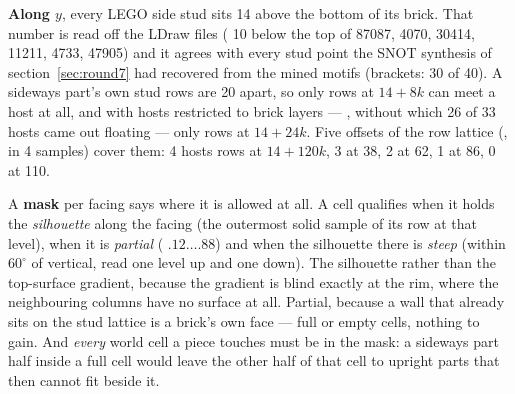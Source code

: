 \textbf{Along $y$}, every LEGO side stud sits 14\ldu{} above the bottom of its brick. That number is read off the LDraw files
( 10\ldu{} below the top of 87087, 4070, 30414, 11211, 4733, 47905) and it agrees with every stud point the SNOT
synthesis of section~\ref{sec:round7} had recovered from the mined motifs (brackets: 30 of 40). A sideways part's own stud rows are
20\ldu{} apart, so only rows at $14 + 8k$ can meet a host at all, and with hosts restricted to brick layers --- ,
without which 26 of 33 hosts came out floating --- only rows at $14 + 24k$. Five offsets of the row lattice (, in
4\ldu{} samples) cover them: 4 hosts rows at $14 + 120k$, 3 at 38, 2 at 62, 1 at 86, 0 at 110.

A \textbf{mask} per facing says where it is allowed at all. A cell qualifies when it holds the \emph{silhouette} along the facing
(the outermost solid sample of its row at that level), when it is \emph{partial} ( $.12\ldots.88$) and when the
silhouette there is \emph{steep} (within  $60^\circ$ of vertical, read one level up and one down). The silhouette
rather than the top-surface gradient, because the gradient is blind exactly at the rim, where the neighbouring columns have no
surface at all. Partial, because a wall that already sits on the stud lattice is a brick's own face --- full or empty cells, nothing
to gain. And \emph{every} world cell a piece touches must be in the mask: a sideways part half inside a full cell would leave the
other half of that cell to upright parts that then cannot fit beside it.

